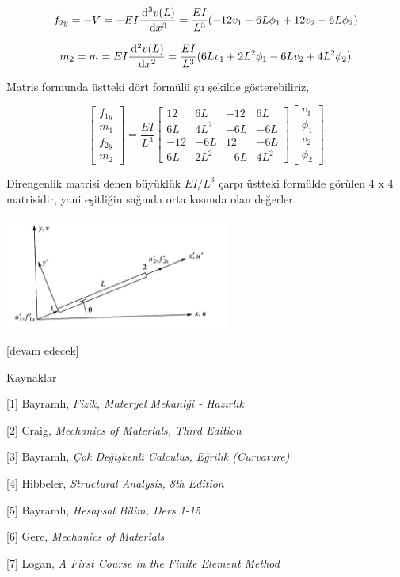 \documentclass[12pt,fleqn]{article}\usepackage{../../common}
\begin{document}
$$
f_{2y} = -V = -EI \frac{\,\mathrm{d}^3 v(L)}{\,\mathrm{d} x^3} =
\frac{EI}{L^3} (-12 v_1 - 6L \phi_1 + 12 v_2 - 6L \phi_2 )
$$

$$
m_2 = m = EI \frac{\,\mathrm{d}^2 v(L)}{\,\mathrm{d} x^2} =
\frac{EI}{L^3} ( 6L v_1 + 2L^2 \phi_1 - 6L v_2 + 4 L^2 \phi_2)
$$

Matris formunda üstteki dört formülü şu şekilde gösterebiliriz,

$$
\left[\begin{array}{c}
f_{1y} \\ m_1 \\ f_{2y} \\ m_2
\end{array}\right] =
\frac{EI}{L^3}
\left[\begin{array}{cccc}
12 & 6L & -12 & 6L \\
6L & 4L^2 & -6L & -6L \\
-12 & -6L & 12 & -6L \\
6L & 2L^2 & -6L & 4L^2
\end{array}\right]
\left[\begin{array}{ccc}
v_1 \\ \phi_1 \\ v_2 \\ \phi_2
\end{array}\right]
$$

Direngenlik matrisi denen büyüklük $EI / L^3$ çarpı üstteki formülde görülen
4 x 4 matrisidir, yani eşitliğin sağında orta kısımda olan değerler.



\includegraphics[width=20em]{phy_020_strs_06_01.jpg}

[devam edecek]

Kaynaklar

[1] Bayramlı, {\em Fizik, Materyel Mekaniği - Hazırlık}

[2] Craig, {\em Mechanics of Materials, Third Edition}

[3] Bayramlı, {\em Çok Değişkenli Calculus, Eğrilik (Curvature)}

[4] Hibbeler, {\em Structural Analysis, 8th Edition}

[5] Bayramlı, {\em Hesapsal Bilim, Ders 1-15}

[6] Gere, {\em Mechanics of Materials}

[7] Logan, {\em A First Course in the Finite Element Method}
\end{document}
